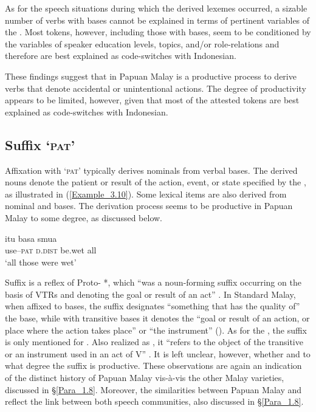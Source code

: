 As for the speech situations during which the derived lexemes occurred, a sizable number of verbs with  bases cannot be explained in terms of pertinent variables of the . Most tokens, however, including those with  bases, seem to be conditioned by the variables of speaker education levels, topics, and/or role-relations and therefore are best explained as code-switches with Indonesian.



These findings suggest that in Papuan Malay  is a productive process to derive  verbs that denote accidental or unintentional actions. The degree of productivity appears to be limited, however, given that most of the attested tokens are best explained as code-switches with Indonesian.


\subsection{Suffix  ‘\textsc{pat}’}\label{Para_3.1.3}

Affixation with  ‘\textsc{pat}’ typically derives nominals from verbal bases. The derived nouns denote the patient or result of the action, event, or state specified by the , as illustrated in (\ref{Example_3.10}). Some lexical items are also derived from nominal and  bases. The derivation process seems to be productive in Papuan Malay to some degree, as discussed below.


\ea
\label{Example_3.10}
 {itu} {basa} {smua}\\ %
 use–\textsc{pat}  \textsc{d.dist}  be.wet  all\\
\glt 
‘all those  were wet’ \textstyleExampleSource{[080917-008-NP.0139]}
\z


Suffix  is a reflex of Proto- *\textitbf{-}, which “was a noun-forming suffix occurring on the basis of VTRs and denoting the goal or result of an act” \citep[174]{Adelaar.1992}. In Standard Malay, when affixed to  bases, the suffix designates “something that has the quality of” the  base, while with transitive bases it denotes the “goal or result of an action, or place where the action takes place” or “the instrument” (\citeyear*[172–173]{Adelaar.1992}). As for the , the suffix is only mentioned for . Also realized as , it “refers to the object of the transitive  or an instrument used in an act of V” \citep[106]{vanMinde.1997}. It is left unclear, however, whether and to what degree the  suffix is productive. These observations are again an indication of the distinct history of Papuan Malay vis-à-vis the other Malay varieties, discussed in §\ref{Para_1.8}. Moreover, the similarities between Papuan Malay and  reflect the link between both speech communities, also discussed in §\ref{Para_1.8}.


